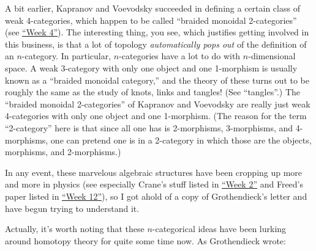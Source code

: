 \documentclass{article}
\begin{document}
A bit earlier, Kapranov and Voevodsky succeeded in defining a certain
class of weak 4-categories, which happen to be called ``braided monoidal
2-categories'' (see \protect\hyperlink{week4}{``Week 4''}). The
interesting thing, you see, which justifies getting involved in this
business, is that a lot of topology \emph{automatically pops out} of the
definition of an \(n\)-category. In particular, \(n\)-categories have a
lot to do with \(n\)-dimensional space. A weak 3-category with only one
object and one 1-morphism is usually known as a ``braided monoidal
category,'' and the theory of these turns out to be roughly the same as
the study of knots, links and tangles! (See ``tangles''.) The ``braided
monoidal 2-categories'' of Kapranov and Voevodsky are really just weak
4-categories with only one object and one 1-morphism. (The reason for
the term ``2-category'' here is that since all one has is 2-morphisms,
3-morphisms, and 4-morphisms, one can pretend one is in a 2-category in
which those are the objects, morphisms, and 2-morphisms.)

In any event, these marvelous algebraic structures have been cropping up
more and more in physics (see especially Crane's stuff listed in
\protect\hyperlink{week2}{``Week 2''} and Freed's paper listed in
\protect\hyperlink{week12}{``Week 12''}), so I got ahold of a copy of
Grothendieck's letter and have begun trying to understand it.

Actually, it's worth noting that these \(n\)-categorical ideas have been
lurking around homotopy theory for quite some time now. As Grothendieck
wrote:
\end{document}
